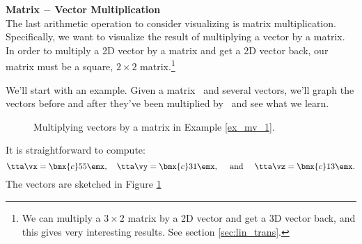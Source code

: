 \noindent \large \textsf{\textbf{Matrix $-$ Vector Multiplication}} \normalsize\\

The last arithmetic operation to consider visualizing is matrix multiplication. Specifically, we want to visualize the result of multiplying a vector by a matrix. In order to multiply a 2D vector by a matrix and get a 2D vector back, our matrix must be a square, $2\times 2$ matrix.\footnote{We can multiply a $3\times 2$ matrix by a 2D vector and get a 3D vector back, and this gives very interesting results. See section \ref{sec:lin_trans}.}

We'll start with an example. Given a matrix \tta\ and several vectors, we'll graph the vectors before and after they've been multiplied by \tta\ and see what we learn.\\

{\begin{figure}[h!]
\begin{center}
\end{center}
\caption{Multiplying vectors by a matrix in Example \ref{ex_mv_1}.}
\label{fig:mv_1}
\end{figure}

It is straightforward to compute: $$\tta\vx = \bmx{c} 5\\5\emx,\quad \tta\vy = \bmx{c} 3\\1\emx, \quad \text{ and } \quad \tta\vz = \bmx{c} 1\\3\emx.$$ The vectors are sketched in Figure \ref{fig:mv_1}
}%

